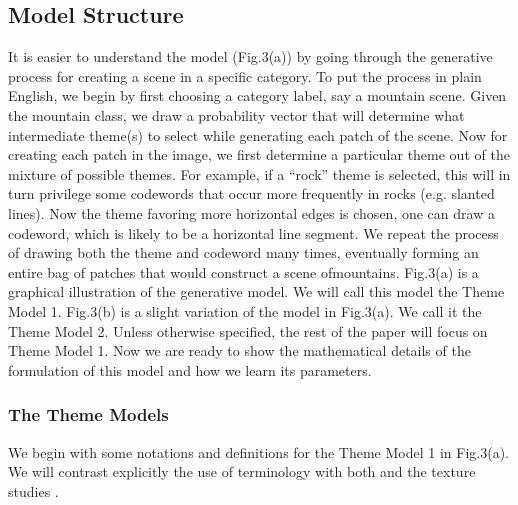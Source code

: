 \documentclass[10pt,a4paper,twocolumn]{article}
\begin{document}
\subsection{Model Structure}
\hspace{.5cm}It is easier to understand the model (Fig.3(a)) by going through the generative process for creating a scene in a specific category. To put the process in plain English, we begin by first choosing a category label, say a mountain scene. Given the mountain class, we draw a probability vector that
will determine what intermediate theme(s) to select while generating each patch of the scene. Now for creating each patch in the image, we first determine a particular theme out of the mixture of possible themes. For example, if a “rock” theme is selected, this will in turn privilege some codewords that occur more frequently in rocks (e.g. slanted lines). Now the theme favoring more horizontal edges is chosen, one can draw a codeword, which is likely to be a horizontal line segment. We repeat the process of drawing both the theme and codeword many times, eventually forming an entire bag of patches that would construct a scene ofmountains. Fig.3(a) is a graphical illustration of the generative model. We will call this model the Theme Model 1. Fig.3(b) is a slight variation of the model in Fig.3(a). We call it the Theme Model 2. Unless otherwise specified, the rest of the paper will focus on Theme Model 1. Now we are ready to show the mathematical details of the formulation of this model and how we learn its parameters.

\subsubsection{The Theme Models}
We begin with some notations and definitions for the Theme Model 1 in Fig.3(a). We will contrast explicitly the use of terminology with both \cite{blei} and the texture studies \cite{malik, varma}.\\
\end{document}
